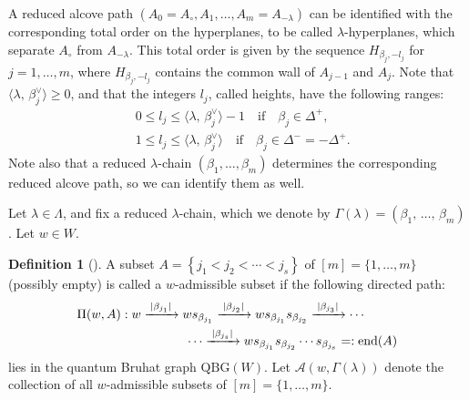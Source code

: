 \documentclass[11pt,a4paper,reqno,dvipdfmx]{amsart}
\numberwithin{equation}{section}
\newcommand{\CA}{\mathcal{A}}
\DeclareMathOperator{\ed}{end}
\newcommand{\QBG}{\mathrm{QBG}}
\newcommand{\edge}[1]{ \xrightarrow{\hspace{2pt}#1\hspace{2pt}} }
\newcommand{\pair}[2]{\langle #1,\,#2 \rangle}
\theoremstyle{plain}
\theoremstyle{definition}
\newtheorem{dfn}[lem]{Definition}
\theoremstyle{remark}
\begin{document}
A reduced alcove path $(A_0=A_{\circ},A_1,\ldots,A_m=A_{-\lambda})$ can be identified 
with the corresponding total order on the hyperplanes, to be called $\lambda$-hyperplanes, 
which separate $A_\circ$ from $A_{-\lambda}$. This total order is given by the sequence 
$H_{\beta_j,-l_j}$ for $j=1,\ldots,m$, where $H_{\beta_j,-l_j}$ contains the common wall of 
$A_{j-1}$ and $A_j$. Note that $\pair{\lambda}{\beta_j^\vee} \ge 0$, and 
that the integers $l_j$, called heights, have the following ranges:
%
\begin{equation*}
%
\begin{split}
& 0 \le l_j \le \pair{\lambda}{\beta_j^\vee}-1 \quad \text{if} \quad \beta_j \in \Delta^+, \\
& 1 \le l_j \le \pair{\lambda}{\beta_j^\vee} \quad \text{if} \quad \beta_j \in \Delta^- = - \Delta^+. 
\end{split}
%
\end{equation*}
%
Note also that a reduced $\lambda$-chain $(\beta_1, \ldots, \beta_m)$ determines 
the corresponding reduced alcove path, so we can identify them as well. 

Let $\lambda \in \Lambda$, and fix a reduced $\lambda$-chain, 
which we denote by $\Gamma(\lambda)=(\beta_1,\,\ldots,\,\beta_m)$. 
Let $w \in W$. 

\begin{dfn}[\cite{LL}] \label{dfn:admissible}
	A subset 
	$A=\left\{ j_1 < j_2 < \cdots < j_s \right\}$ of $[m]=\{1,\ldots,m\}$ (possibly empty)
 	is called a $w$-admissible subset if
	the following directed path:
%
	\begin{equation} \label{eqn:admissible}
	\begin{split}
	& \Pi(w,A): w \edge{|\beta_{j_1}|} w s_{\beta_{j_1}}
	\edge{|\beta_{j_2}|}  ws_{\beta_{j_1}}s_{\beta_{j_2}}
	\edge{|\beta_{j_3}|}  \cdots \\
	& \hspace{30mm} \cdots 
	\edge{|\beta_{j_s}|}  ws_{\beta_{j_1}}s_{\beta_{j_2}} \cdots s_{\beta_{j_s}}=:\ed(A) 
	\end{split}
	\end{equation}
%
	lies in the quantum Bruhat graph $\QBG(W)$. 
%
 	Let $\CA(w,\Gamma(\lambda))$ denote the collection of all $w$-admissible subsets of $[m] = \{1, \ldots, m\}$.
\end{dfn}
\end{document}
